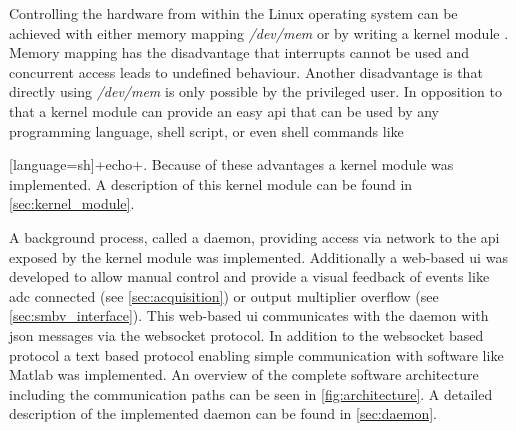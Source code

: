 \documentclass[12pt,a4paper,parskip=full,abstract=true,BCOR=12mm,twoside,open=right]{scrreprt}
\newcommand*{\SavedLstInline}{}
\DeclareRobustCommand*{\lstinline}{%
  \ifmmode
    \let\SavedBGroup\bgroup
    \def\bgroup{%
      \let\bgroup\SavedBGroup
      \hbox\bgroup
    }%
  \fi
  \SavedLstInline
}
\def\device#1{\mbox{\textit{#1}}}
\begin{document}
Controlling the hardware from within the Linux operating system can be
achieved with either memory mapping \device{/dev/mem} or by writing a kernel
module \cite{ldd}. Memory mapping has the disadvantage that interrupts cannot
be used and concurrent access leads to undefined behaviour. Another disadvantage
is that directly using \device{/dev/mem} is only possible by the
privileged user\cite{ldd}. In opposition to that a kernel module can provide an easy \gls{api} that
can be used by any programming language, shell script, or even shell commands
like \lstinline[language=sh]+echo+. Because of these advantages a kernel module
was implemented. A description of this kernel module can be found in
\cref{sec:kernel_module}.

A background process, called a daemon, providing access via network to the \gls{api}
exposed by the kernel module was implemented. Additionally a web-based \gls{ui} was developed
to allow manual control and provide a visual feedback of events like \gls{adc} connected (see
\cref{sec:acquisition}) or output multiplier overflow (see \cref{sec:smbv_interface}).
This web-based \gls{ui} communicates with the daemon with \gls{json} messages via
the websocket protocol. In addition to the websocket based protocol a text based protocol enabling
simple communication with software like Matlab was implemented. An overview of the
complete software architecture including the communication paths can be seen in
\cref{fig:architecture}. A detailed description of the implemented daemon can be
found in \cref{sec:daemon}.
\end{document}
